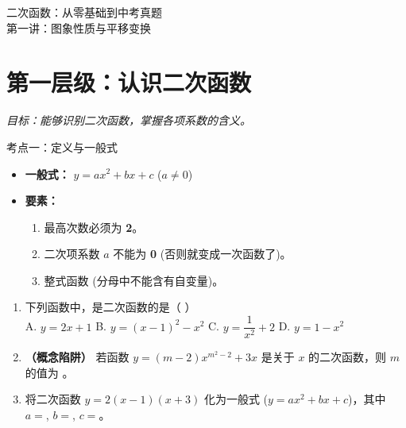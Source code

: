 \documentclass[12pt, a4paper]{article}
\begin{document}
\begin{center}
    { \heiti 二次函数：从零基础到中考真题} \\
    \vspace{0.1cm}
    {\large \kaishu 第一讲：图象性质与平移变换}
\end{center}

\vspace{0.1cm}

\section{第一层级：认识二次函数}
\textit{目标：能够识别二次函数，掌握各项系数的含义。}

\begin{conceptbox}{考点一：定义与一般式}
    \begin{itemize}
        \item \textbf{一般式：} $y = ax^2 + bx + c$ \quad ($a \neq 0$)
        \item \textbf{要素：} 
        \begin{enumerate}
            \item 最高次数必须为 \textbf{2}。
            \item 二次项系数 $a$ 不能为 \textbf{0} (否则就变成一次函数了)。
            \item 整式函数 (分母中不能含有自变量)。
        \end{enumerate}
    \end{itemize}
\end{conceptbox}

\begin{examplebox}
    \begin{enumerate}[label=\textbf{例\arabic*.}]
        \item 下列函数中，是二次函数的是（ \quad ）\\
        A. $y = 2x + 1$ \quad B. $y = (x-1)^2 - x^2$ \quad C. $y = \dfrac{1}{x^2} + 2$ \quad D. $y = 1 - x^2$
        
        \item \textbf{（概念陷阱）} 若函数 $y = (m-2)x^{m^2-2} + 3x$ 是关于 $x$ 的二次函数，则 $m$ 的值为 \underline{\hspace{2cm}}。
        
        \item 将二次函数 $y = 2(x-1)(x+3)$ 化为一般式 ($y=ax^2+bx+c$)，其中 $a=$\underline{\hspace{1cm}}, $b=$\underline{\hspace{1cm}}, $c=$\underline{\hspace{1cm}}。
    \end{enumerate}
\end{examplebox}
\end{document}
